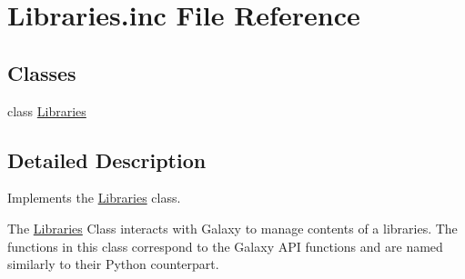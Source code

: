 \hypertarget{Libraries_8inc}{}\section{Libraries.\+inc File Reference}
\label{Libraries_8inc}
\subsection*{Classes}
\begin{DoxyCompactItemize}
\item 
class \hyperlink{classLibraries}{Libraries}
\end{DoxyCompactItemize}


\subsection{Detailed Description}
Implements the \hyperlink{classLibraries}{Libraries} class.

The \hyperlink{classLibraries}{Libraries} Class interacts with Galaxy to manage contents of a libraries. The functions in this class correspond to the Galaxy A\+PI functions and are named similarly to their Python counterpart. 